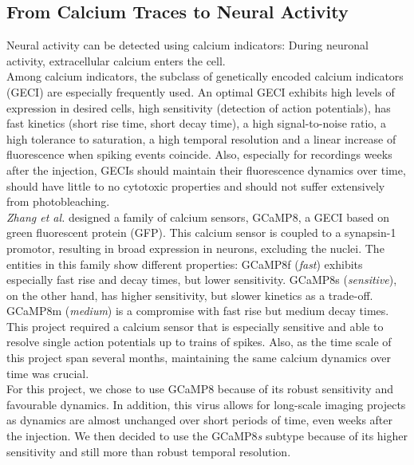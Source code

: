 \subsection{From Calcium Traces to Neural Activity}
Neural activity can be detected using calcium indicators: During neuronal activity, extracellular calcium enters the cell.\\
Among calcium indicators, the subclass of genetically encoded calcium indicators (GECI) are especially frequently used. An optimal GECI exhibits high levels of expression in desired cells, high sensitivity (detection of action potentials), has fast kinetics (short rise time, short decay time), a high signal-to-noise ratio, a high tolerance to saturation, a high temporal resolution and a linear increase of fluorescence when spiking events coincide. Also, especially for recordings weeks after the injection, GECIs should maintain their fluorescence dynamics over time, should have little to no cytotoxic properties and should not suffer extensively from photobleaching. \cite{Zhang2023} \\
\textit{Zhang et al.} designed a family of calcium sensors, GCaMP8, a GECI based on green fluorescent protein (GFP). This calcium sensor is coupled to a synapsin-1 promotor, resulting in broad expression in neurons, excluding the nuclei. The entities in this family show different properties: GCaMP8f (\textit{fast}) exhibits especially fast rise and decay times, but lower sensitivity. GCaMP8s (\textit{sensitive}), on the other hand, has higher sensitivity, but slower kinetics as a trade-off. GCaMP8m (\textit{medium}) is a compromise with fast rise but medium decay times. \cite{Zhang2023} \\
This project required a calcium sensor that is especially sensitive and able to resolve single action potentials up to trains of spikes. Also, as the time scale of this project span several months, maintaining the same calcium dynamics over time was crucial. \\
For this project, we chose to use GCaMP8 because of its robust sensitivity and favourable dynamics. In addition, this virus allows for long-scale imaging projects as dynamics are almost unchanged over short periods of time, even weeks after the injection.  \cite{Zhang2023} We then decided to use the GCaMP8\textit{s} subtype because of its higher sensitivity and still more than robust temporal resolution. 
